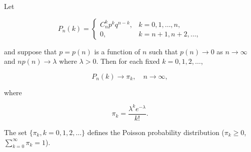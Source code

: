 Let

$$P_n(k) = \begin{cases} C_n^k p^k q^{n-k}, & k = 0, 1, \ldots, n, \\ 0, & k = n + 1, n + 2, \ldots, \end{cases}$$

and suppose that $p = p(n)$ is a function of $n$ such that $p(n) \to 0$ as $n \to \infty$ and $np(n) \to \lambda$ where $\lambda > 0$. Then for each fixed $k = 0, 1, 2, \ldots$,

$$P_n(k) \to \pi_k, \quad n \to \infty,$$

where

$$\pi_k = \frac{\lambda^k e^{-\lambda}}{k!}.$$

The set $\{\pi_k, k = 0, 1, 2, \ldots\}$ defines the Poisson probability distribution ($\pi_k \geq 0$, $\sum_{k=0}^{\infty} \pi_k = 1$).
